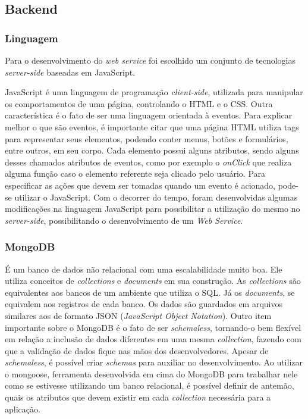 \documentclass[
	12pt,				%
	oneside,			%
	a4paper,			%
	brazil				%
]{abntex2}
\begin{document}
{\subsection{Backend}

\subsubsection{Linguagem}

Para o desenvolvimento do \textit{web service} foi escolhido um conjunto de tecnologias \textit{server-side} baseadas em JavaScript.


JavaScript é uma linguagem de programação \textit{client-side}, utilizada para manipular os comportamentos de uma página, controlando o HTML e o CSS. Outra característica é o fato de ser uma linguagem orientada à eventos.
Para explicar melhor o que são eventos, é importante citar que uma página HTML utiliza tags para representar seus elementos, podendo conter menus, botões e formulários, entre outros, em seu corpo. Cada elemento possui alguns atributos, sendo alguns desses chamados atributos de eventos, como por exemplo o \textit{onClick} que realiza alguma função caso o elemento referente seja clicado pelo usuário.
Para especificar as ações que devem ser tomadas quando um evento é acionado, pode-se utilizar o JavaScript. Com o decorrer do tempo, foram desenvolvidas algumas modificações na linguagem JavaScript para possibilitar a utilização do mesmo no \textit{server-side}, possibilitando o desenvolvimento de um \textit{Web Service}. \\

\subsubsection{MongoDB}

É um banco de dados não relacional com uma escalabilidade muito boa. Ele utiliza conceitos de \textit{collections} e \textit{documents} em sua construção. 
As \textit{collections} são equivalentes aos bancos de um ambiente que utiliza o SQL. Já os \textit{documents}, se equivalem aos registros de cada banco.
Os dados são guardados em arquivos similares aos de formato JSON (\textit{JavaScript Object Notation}).
Outro item importante sobre o MongoDB é o fato de ser \textit{schemaless}, tornando-o bem flexível em relação a inclusão de dados diferentes em uma mesma \textit{collection}, fazendo com que a validação de dados fique nas mãos dos desenvolvedores.
Apesar de \textit{schemaless}, é possível criar \textit{schemas} para auxiliar no desenvolvimento. Ao utilizar o mongoose, ferramenta desenvolvida em cima do MongoDB para trabalhar nele como se estivesse utilizando um banco relacional, é possível definir de antemão, quais os atributos que devem existir em cada \textit{collection} necessária para a aplicação.


}
\end{document}
